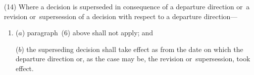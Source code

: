 \documentclass[a4paper,12pt]{article}
\begin{document}
(14) Where a decision is superseded in consequence of a departure direction or~a revision or~supersession of a decision with respect to a departure direction---
\begin{enumerate}\item[]
($a$) paragraph~(6) above shall not apply; and

($b$) the superseding decision shall take effect as from the date on which the departure direction or, as the case may be, the revision or~supersession, took effect.
\end{enumerate}

%
%
%
%
\end{document}
